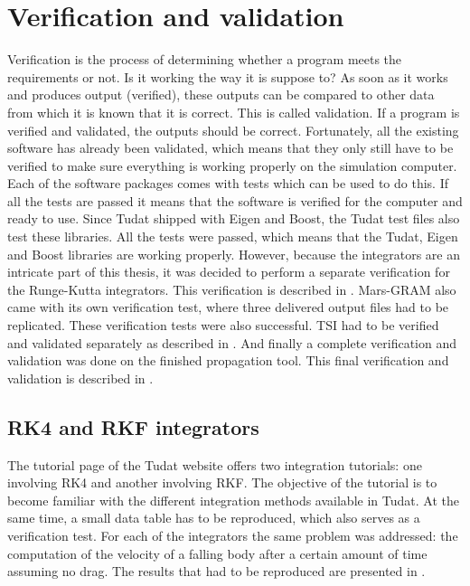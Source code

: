 \chapter{Verification and validation} 
\label{ch:verificationandvalidation}
Verification is the process of determining whether a program meets the requirements or not. Is it working the way it is suppose to? As soon as it works and produces output (verified), these outputs can be compared to other data from which it is known that it is correct. This is called validation. If a program is verified and validated, the outputs should be correct. Fortunately, all the existing software has already been validated, which means that they only still have to be verified to make sure everything is working properly on the simulation computer. Each of the software packages comes with tests which can be used to do this. If all the tests are passed it means that the software is verified for the computer and ready to use. Since \ac{Tudat} shipped with Eigen and Boost, the \ac{Tudat} test files also test these libraries. All the tests were passed, which means that the \ac{Tudat}, Eigen and Boost libraries are working properly. However, because the integrators are an intricate part of this thesis, it was decided to perform a separate verification for the Runge-Kutta integrators. This verification is described in . Mars-\ac{GRAM} also came with its own verification test, where three delivered output files had to be replicated. These verification tests were also successful. \ac{TSI} had to be verified and validated separately as described in . And finally a complete verification and validation was done on the finished propagation tool. This final verification and validation is described in .


\section{\acs{RK4} and \acs{RKF} integrators}
\label{sec:rkandrkfver}
The tutorial page of the \ac{Tudat} website \citep{dirkx2016tudat} offers two integration tutorials: one involving \ac{RK4} and another involving \ac{RKF}. The objective of the tutorial is to become familiar with the different integration methods available in \ac{Tudat}. At the same time, a small data table has to be reproduced, which also serves as a verification test. For each of the integrators the same problem was addressed: the computation of the velocity of a falling body after a certain amount of time assuming no drag. The results that had to be reproduced are presented in .


